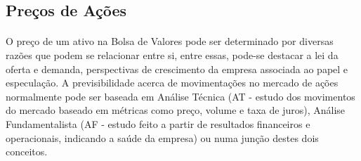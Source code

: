 \documentclass[grad,numbers]{coppe}
\begin{document}
  	\subsection{Preços de Ações}
  		\paragraph{}O preço de um ativo na Bolsa de Valores pode ser determinado por diversas razões que podem se relacionar entre si, entre essas, pode-se destacar a lei da oferta e demanda, perspectivas de crescimento da empresa associada ao papel e especulação. A previsibilidade acerca de movimentações no mercado de ações normalmente pode ser baseada em Análise Técnica (AT - estudo dos movimentos do mercado baseado em métricas como preço, volume e taxa de juros\cite{analise-tecnica}), Análise Fundamentalista (AF - estudo feito a partir de resultados financeiros e operacionais, indicando a saúde da empresa\cite{analise-fundamentalista}) ou numa junção destes dois conceitos.
\end{document}
